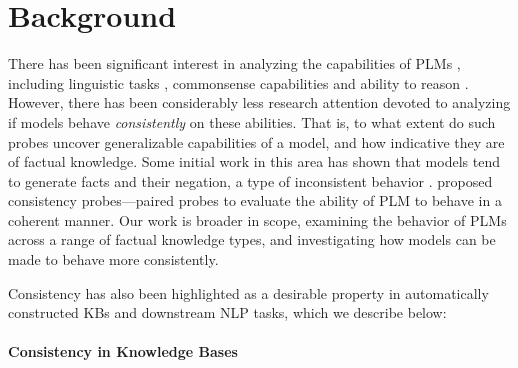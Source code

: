 







\section{Background}
\label{sec:background}

There has been significant interest in analyzing the capabilities of PLMs \cite{rogers2020primer}, including linguistic tasks \cite{yoav-syntax,hewitt2019structural,tenney2019bert,amnesic_probing}, commonsense capabilities \cite{forbes2019neural, da2019cracking,zhang2020language} and ability to reason \cite{talmor2019olmpics, kassner-etal-2020-pretrained}. However, there has been considerably less research attention devoted to analyzing if models behave \emph{consistently} on these abilities. That is, to what extent do such probes uncover generalizable capabilities of a model, and how indicative they are of 
factual knowledge. 
Some initial work in this area has shown that models tend to generate facts and their negation, a type of inconsistent behavior \cite{Ettinger_2020,kassner-schutze-2020-negated}.  proposed consistency probes---paired probes to evaluate the ability of PLM to behave in a coherent manner. Our work is broader in scope, examining the behavior of PLMs across a range of factual knowledge types, and investigating how models can be made to behave more consistently. 

Consistency has also been highlighted as a desirable property in automatically constructed KBs and downstream NLP tasks, which we describe below:

\paragraph{Consistency in Knowledge Bases}

